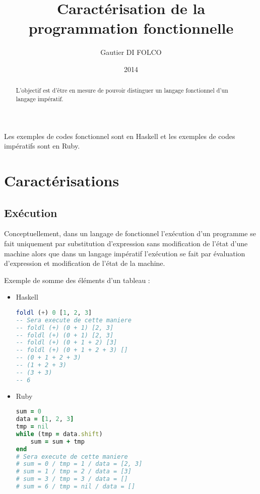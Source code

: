 \documentclass{article}
\title{Caractérisation de la programmation fonctionnelle}
\author{Gautier DI FOLCO}
\date{2014}
\begin{document}
\maketitle
\tableofcontents

\begin{abstract}
L'objectif est d'être en mesure de pouvoir distinguer un langage fonctionnel
d'un langage impératif.
\end{abstract}

Les exemples de codes fonctionnel sont en Haskell et les exemples de codes impératifs sont en Ruby.

\section{Caractérisations}
\subsection{Exécution}
Conceptuellement, dans un langage de fonctionnel l’exécution d’un programme se
fait uniquement par substitution d’expression sans modification de l’état d’une
machine alors que dans un langage impératif l’exécution se fait par évaluation
d’expression et modification de l’état de la machine.

Exemple de somme des éléments d'un tableau :

\begin{itemize}
    \item Haskell

\begin{lstlisting}[language=haskell]
foldl (+) 0 [1, 2, 3]
-- Sera execute de cette maniere
-- foldl (+) (0 + 1) [2, 3]
-- foldl (+) (0 + 1) [2, 3]
-- foldl (+) (0 + 1 + 2) [3]
-- foldl (+) (0 + 1 + 2 + 3) []
-- (0 + 1 + 2 + 3)
-- (1 + 2 + 3)
-- (3 + 3)
-- 6
\end{lstlisting}

    \item Ruby

\begin{lstlisting}[language=ruby]
sum = 0
data = [1, 2, 3]
tmp = nil
while (tmp = data.shift)
    sum = sum + tmp
end
# Sera execute de cette maniere
# sum = 0 / tmp = 1 / data = [2, 3]
# sum = 1 / tmp = 2 / data = [3]
# sum = 3 / tmp = 3 / data = []
# sum = 6 / tmp = nil / data = []
\end{lstlisting}
\end{itemize}
\end{document}
